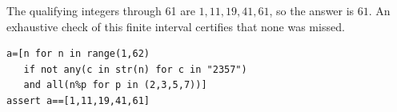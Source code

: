 The qualifying integers through 61 are $1,11,19,41,61$, so the answer is $\boxed{61}$. An exhaustive check of this finite interval certifies that none was missed.
\begin{verbatim}
a=[n for n in range(1,62)
   if not any(c in str(n) for c in "2357")
   and all(n%p for p in (2,3,5,7))]
assert a==[1,11,19,41,61]
\end{verbatim}
